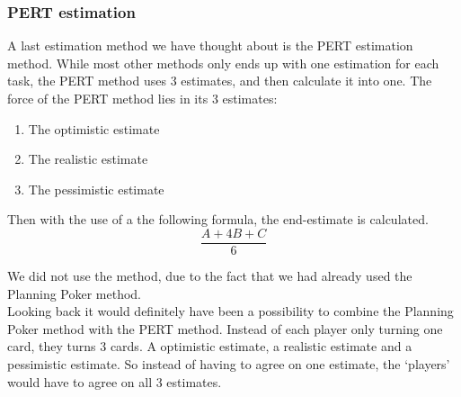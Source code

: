 \subsubsection{PERT estimation}
A last estimation method we have thought about is the PERT estimation method. While most other methods only ends up with one estimation for each task, the PERT method uses 3 estimates, and then calculate it into one. The force of the PERT method lies in its 3 estimates:
\begin{enumerate}[label=\Alph{*}\hspace{0.8em}]
	\item The optimistic estimate
	\item The realistic estimate
	\item The pessimistic estimate
\end{enumerate}
Then with the use of a the following formula, the end-estimate is calculated.
\begin{equation}
	\frac{A+4B+C}{6}
\end{equation}

We did not use the method, due to the fact that we had already used the Planning Poker method.\\
Looking back it would definitely have been a possibility to combine the Planning Poker method with the PERT method. Instead of each player only turning one card, they turns 3 cards. A optimistic estimate, a realistic estimate and a pessimistic estimate. So instead of having to agree on one estimate, the `players' would have to agree on all 3 estimates.